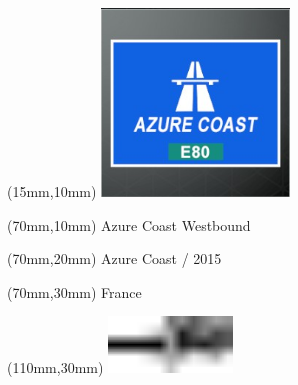 \null\newpage
\begin{textblock*}{50mm}(15mm,10mm)%
\includegraphics[width=50mm]{LG/2015-05-20_00073.png}
\end{textblock*}
\begin{textblock*}{130mm}(70mm,10mm)%
{\fontsize{20}{20}\selectfont Azure Coast Westbound}\\
\end{textblock*}
\begin{textblock*}{120mm}(70mm,20mm)%
{\fontsize{16}{16}\selectfont Azure Coast / 2015}\\
\end{textblock*}
\begin{textblock*}{120mm}(70mm,30mm)%
{\fontsize{12}{12}\selectfont France}
\end{textblock*}
\begin{textblock*}{30mm}(110mm,30mm)%
\centering
\includegraphics[height=15mm]{icons/tofinish.pdf}
\end{textblock*}
